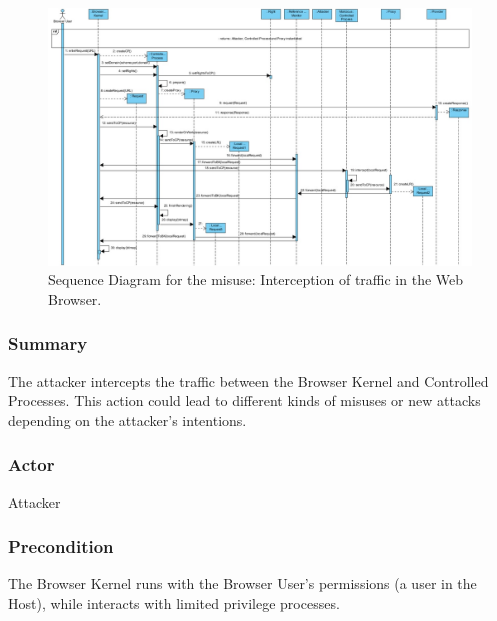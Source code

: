 \documentclass{sig-alternate-05-2015}
\begin{document}
\begin{landscape}
\begin{figure}[h!t]
  \centering
  \hspace*{-7cm}\includegraphics[scale=0.8]{figures/MakeRequestMisuse_v8.jpg}
  \caption{Sequence Diagram for the misuse: Interception of traffic in the Web Browser.}
  \label{fig:SeqMisuse}
\end{figure}
\end{landscape}

  
  \subsubsection*{Summary} The attacker intercepts the traffic between the Browser Kernel and Controlled Processes. This action could lead to different kinds of misuses or new attacks depending on the attacker's intentions.
  \subsubsection*{Actor} Attacker
  \subsubsection*{Precondition} The Browser Kernel runs with the Browser User's permissions (a user in the Host), while interacts with limited privilege processes.
\end{document}
